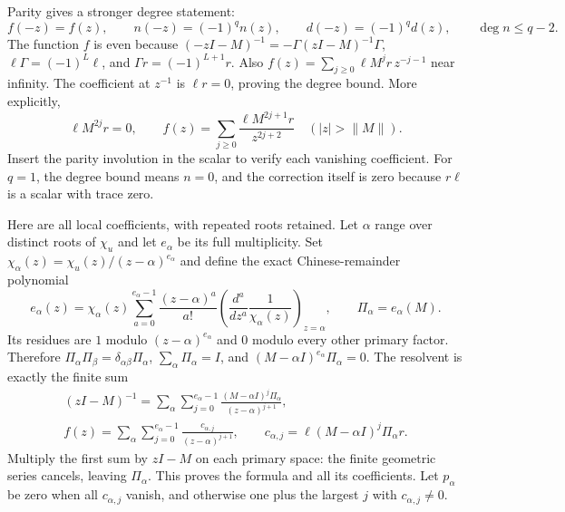 \documentclass[11pt]{article}
\begin{document}
Parity gives a stronger degree statement:
\begin{equation}\tag{NS12}\label{sfsec:NS12}
f(-z)=f(z),\qquad
n(-z)=(-1)^qn(z),\qquad
d(-z)=(-1)^qd(z),\qquad
\deg n\leq q-2 .
\end{equation}
The function $f$ is even because
$(-zI-M)^{-1}=-\Gamma(zI-M)^{-1}\Gamma$,
$\ell\Gamma=(-1)^L\ell$, and $\Gamma r=(-1)^{L+1}r$.
Also
$f(z)=\sum_{j\geq0}\ell M^jr\,z^{-j-1}$ near infinity.
The coefficient at $z^{-1}$ is $\ell r=0$, proving the degree
bound. More explicitly,
\begin{equation}\tag{NS13}\label{sfsec:NS13}
\ell M^{2j}r=0,\qquad
f(z)=\sum_{j\geq0}\frac{\ell M^{2j+1}r}{z^{2j+2}}
\quad(|z|>\|M\|).
\end{equation}
Insert the parity involution in the scalar to verify each
vanishing coefficient. For $q=1$, the degree bound means
$n=0$, and the correction itself is zero because $r\ell$
is a scalar with trace zero.

Here are all local coefficients, with repeated roots retained.
Let $\alpha$ range over distinct roots of $\chi_u$ and let
$e_\alpha$ be its full multiplicity. Set
$\chi_{\alpha}(z)=\chi_u(z)/(z-\alpha)^{e_\alpha}$ and define
the exact Chinese-remainder polynomial
\begin{equation}\tag{NS14}\label{sfsec:NS14}
e_\alpha(z)=\chi_\alpha(z)
\sum_{a=0}^{e_\alpha-1}
\frac{(z-\alpha)^a}{a!}
\left(\frac{d^a}{dz^a}\frac1{\chi_\alpha(z)}\right)_{z=\alpha},
\qquad \Pi_\alpha=e_\alpha(M).
\end{equation}
Its residues are $1$ modulo $(z-\alpha)^{e_\alpha}$ and
$0$ modulo every other primary factor. Therefore
$\Pi_\alpha\Pi_\beta=\delta_{\alpha\beta}\Pi_\alpha$,
$\sum_\alpha\Pi_\alpha=I$, and
$(M-\alpha I)^{e_\alpha}\Pi_\alpha=0$.
The resolvent is exactly the finite sum
\begin{equation}\tag{NS15}\label{sfsec:NS15}
\begin{gathered}
(zI-M)^{-1}
 =\sum_\alpha\sum_{j=0}^{e_\alpha-1}
       \frac{(M-\alpha I)^j\Pi_\alpha}{(z-\alpha)^{j+1}},\\
f(z)=\sum_\alpha\sum_{j=0}^{e_\alpha-1}
       \frac{c_{\alpha,j}}{(z-\alpha)^{j+1}},\qquad
c_{\alpha,j}=\ell(M-\alpha I)^j\Pi_\alpha r .
\end{gathered}
\end{equation}
Multiply the first sum by $zI-M$ on each primary space:
the finite geometric series cancels, leaving $\Pi_\alpha$.
This proves the formula and all its coefficients.
Let $p_\alpha$ be zero when all $c_{\alpha,j}$ vanish,
and otherwise one plus the largest $j$ with
$c_{\alpha,j}\ne0$.
\end{document}

